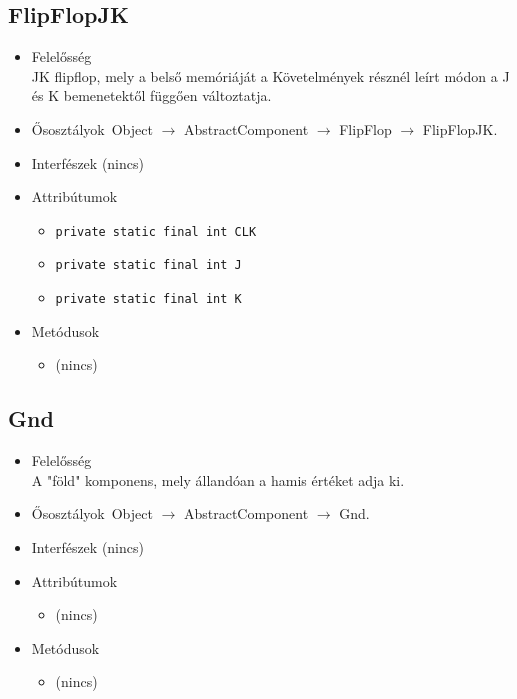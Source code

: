 \subsection{FlipFlopJK}
\begin{itemize}
\item Felelősség\\
JK flipflop, mely a belső memóriáját a Követelmények résznél leírt módon  a J és K bemenetektől függően változtatja.
\item Ősosztályok\ Object $\rightarrow{}$ AbstractComponent $\rightarrow{}$ FlipFlop $\rightarrow{}$ FlipFlopJK.
\item Interfészek (nincs)
\item Attribútumok $\ $
\begin{itemize}
	\item \texttt{private static final int CLK} 
	\item \texttt{private static final int J} 
	\item \texttt{private static final int K} 
\end{itemize}
\item Metódusok$\ $
\begin{itemize}
\item (nincs)
\end{itemize}
\end{itemize}

\subsection{Gnd}
\begin{itemize}
\item Felelősség\\
A "föld" komponens, mely állandóan a hamis értéket adja ki.
\item Ősosztályok\ Object $\rightarrow{}$ AbstractComponent $\rightarrow{}$ Gnd.
\item Interfészek (nincs)
\item Attribútumok $\ $
\begin{itemize}
\item (nincs)
\end{itemize}
\item Metódusok$\ $
\begin{itemize}
\item (nincs)
\end{itemize}
\end{itemize}

